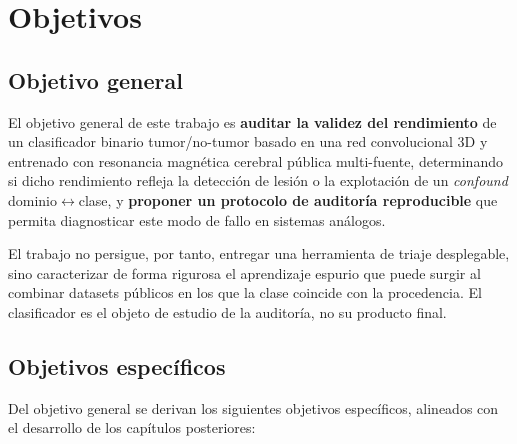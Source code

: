 \chapter{Objetivos}

\section{Objetivo general}

El objetivo general de este trabajo es \textbf{auditar la validez del rendimiento}
de un clasificador binario tumor/no-tumor basado en una red convolucional 3D y
entrenado con resonancia magnética cerebral pública multi-fuente, determinando si
dicho rendimiento refleja la detección de lesión o la explotación de un
\emph{confound} dominio$\leftrightarrow$clase, y \textbf{proponer un protocolo de
auditoría reproducible} que permita diagnosticar este modo de fallo en sistemas
análogos.

El trabajo no persigue, por tanto, entregar una herramienta de triaje
desplegable, sino caracterizar de forma rigurosa el aprendizaje espurio que puede
surgir al combinar datasets públicos en los que la clase coincide con la
procedencia. El clasificador es el objeto de estudio de la auditoría, no su
producto final.

\section{Objetivos específicos}

Del objetivo general se derivan los siguientes objetivos específicos, alineados
con el desarrollo de los capítulos posteriores:

